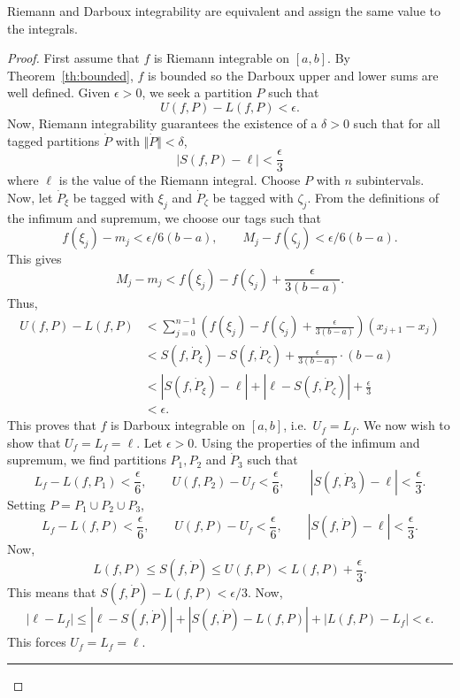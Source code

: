 \documentclass[11pt]{article}
\theoremstyle{definition}
\theoremstyle{remark}
\numberwithin{equation}{module}
\begin{document}
    \begin{theorem}
        Riemann and Darboux integrability are equivalent and assign the same value
        to the integrals. 
    \end{theorem}
    \begin{proof}
        First assume that $f$ is Riemann integrable on $[a, b]$. By
        Theorem~\ref{th:bounded}, $f$ is bounded so the Darboux upper and lower sums
        are well defined. Given $\epsilon > 0$, we seek a partition $P$ such that \[
            U(f, P) - L(f, P) < \epsilon.
        \] Now, Riemann integrability guarantees the existence of a $\delta > 0$
        such that for all tagged partitions $\dot{P}$ with $\Vert\dot{P}\Vert <
        \delta$, \[
            |S(f, P) - \ell| < \frac{\epsilon}{3}
        \] where $\ell$ is the value of the Riemann integral. Choose $P$ with $n$
        subintervals. Now, let $\dot{P}_\xi$ be tagged with $\xi_j$ and
        $\dot{P}_\zeta$ be tagged with $\zeta_j$. From the definitions of the
        infimum and supremum, we choose our tags such that \[
            f(\xi_j)  - m_j < \epsilon / 6(b - a), \qquad 
            M_j - f(\zeta_j) < \epsilon / 6(b - a).
        \] This gives \[
            M_j - m_j < f(\xi_j) - f(\zeta_j) + \frac{\epsilon}{3(b - a)}.
        \] Thus, \begin{align*}
            U(f, P) - L(f, P) &< \sum_{j = 0}^{n - 1} \left(f(\xi_j) - f(\zeta_j) +
            \frac{\epsilon}{3(b - a)}\right)(x_{j + 1} - x_{j}) \\
            &< S(f, \dot{P}_\xi) - S(f, \dot{P}_\zeta) + \frac{\epsilon}{3(b -
            a)}\cdot(b - a) \\
            &< |S(f, \dot{P}_\xi) - \ell| + |\ell - S(f, \dot{P}_\zeta)| +
            \frac{\epsilon}{3} \\
            &< \epsilon.
        \end{align*}
        This proves that $f$ is Darboux integrable on $[a, b]$, i.e.\ $U_f = L_f$.
        We now wish to show that $U_f = L_f = \ell$. Let $\epsilon > 0$. Using the
        properties of the infimum and supremum, we find partitions $P_1, P_2$ and
        $\dot{P}_3$ such that \[
            L_f - L(f, P_1) < \frac{\epsilon}{6}, \qquad
            U(f, P_2) - U_f < \frac{\epsilon}{6}, \qquad
            |S(f, \dot{P}_3) - \ell| < \frac{\epsilon}{3}.
        \] Setting $P = P_1 \cup P_2 \cup P_3$, \[
            L_f - L(f, P) < \frac{\epsilon}{6}, \qquad
            U(f, P) - U_f < \frac{\epsilon}{6}, \qquad
            |S(f, \dot{P}) - \ell| < \frac{\epsilon}{3}.
        \] Now, \[
            L(f, P) \leq S(f, \dot{P}) \leq U(f, P) < L(f, P) + \frac{\epsilon}{3}.
        \] This means that $S(f, \dot{P}) - L(f, P) < \epsilon / 3$. Now, \[
            |\ell - L_f| \leq |\ell - S(f, \dot{P})| + |S(f, \dot{P}) - L(f, P)| +
            |L(f, P) - L_f| < \epsilon.
        \] This forces $U_f = L_f = \ell$.
        \begin{center}
            \rule{5em}{0.5pt}
        \end{center}


\end{proof}
\end{document}
